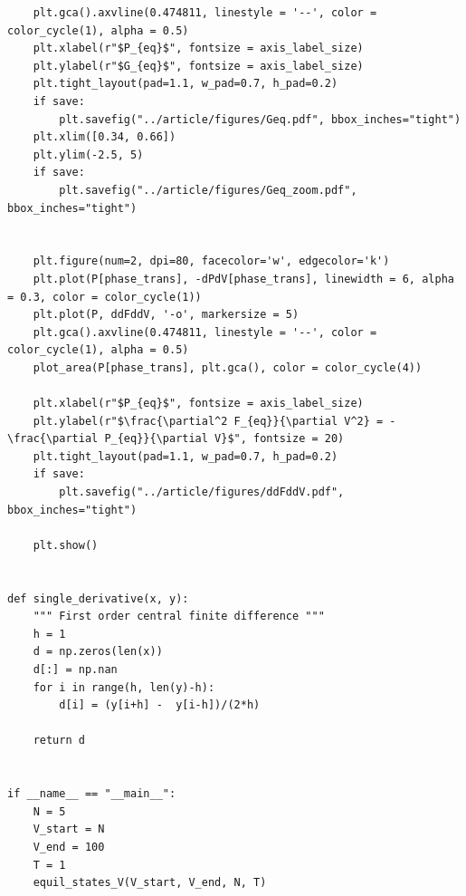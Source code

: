 \documentclass[reprint, amsmath, amssymb, aps, onecolumn]{revtex4-2}
\begin{document}
\begin{verbatim}
    plt.gca().axvline(0.474811, linestyle = '--', color = color_cycle(1), alpha = 0.5)
    plt.xlabel(r"$P_{eq}$", fontsize = axis_label_size)
    plt.ylabel(r"$G_{eq}$", fontsize = axis_label_size)
    plt.tight_layout(pad=1.1, w_pad=0.7, h_pad=0.2)
    if save:
        plt.savefig("../article/figures/Geq.pdf", bbox_inches="tight")
    plt.xlim([0.34, 0.66])
    plt.ylim(-2.5, 5)
    if save:
        plt.savefig("../article/figures/Geq_zoom.pdf", bbox_inches="tight")


    plt.figure(num=2, dpi=80, facecolor='w', edgecolor='k')
    plt.plot(P[phase_trans], -dPdV[phase_trans], linewidth = 6, alpha = 0.3, color = color_cycle(1))
    plt.plot(P, ddFddV, '-o', markersize = 5)
    plt.gca().axvline(0.474811, linestyle = '--', color = color_cycle(1), alpha = 0.5)
    plot_area(P[phase_trans], plt.gca(), color = color_cycle(4))

    plt.xlabel(r"$P_{eq}$", fontsize = axis_label_size)
    plt.ylabel(r"$\frac{\partial^2 F_{eq}}{\partial V^2} = - \frac{\partial P_{eq}}{\partial V}$", fontsize = 20)
    plt.tight_layout(pad=1.1, w_pad=0.7, h_pad=0.2)
    if save:
        plt.savefig("../article/figures/ddFddV.pdf", bbox_inches="tight")

    plt.show()


def single_derivative(x, y):
    """ First order central finite difference """
    h = 1
    d = np.zeros(len(x))
    d[:] = np.nan
    for i in range(h, len(y)-h):
        d[i] = (y[i+h] -  y[i-h])/(2*h)

    return d


if __name__ == "__main__":
    N = 5
    V_start = N
    V_end = 100
    T = 1
    equil_states_V(V_start, V_end, N, T)
\end{verbatim}
\end{document}
